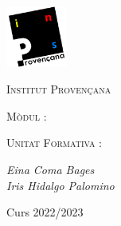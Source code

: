 \begin{titlepage}
	\centering
	\includegraphics*[width=0.15\textwidth]{provencana_color.pdf}
	\par\vspace{0.5cm}

	{\scshape\Large Institut Provençana \par}

	\vspace{1cm}

	{\itshape\Large \acttipus \par}
	{\bfseries\LARGE \actnom \par}
	
	\vspace{1cm}
	
	{\scshape\large Mòdul \modulnum: \par}
	{\scshape\Large \modulnom \par}

	\vspace{1cm}
	
	{\scshape\normalsize Unitat Formativa \ufnum: \par}
	{\scshape\large \ufnom \par}

	\vfill
	{\Large\itshape Eina Coma Bages \\ Iris Hidalgo Palomino \par}
	\vfill

	Curs 2022/2023
\end{titlepage}